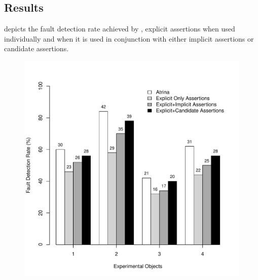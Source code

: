 \subsection{Results} \label{Sec:results}
  depicts the fault detection rate achieved by \tool, explicit assertions when used individually and when it is used in conjunction with either implicit assertions or candidate assertions. 

\begin{figure}[!t]
  \centering
  \includegraphics[width=1\hsize]{r-scripts/assertionTypeFaultDetec}
  \vspace{-0.18in} 
  \vspace{-0.1in} 
  \label{Fig:assertionTypeFaultDetec}
 
\end{figure}


